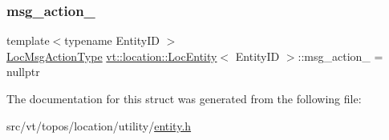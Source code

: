 \subsubsection{\texorpdfstring{msg\+\_\+action\+\_\+}{msg\_action\_}}
{\footnotesize\ttfamily template$<$typename Entity\+ID $>$ \\
\hyperlink{namespacevt_1_1location_ad0a130e4d79e745543925240e13e8f08}{Loc\+Msg\+Action\+Type} \hyperlink{structvt_1_1location_1_1_loc_entity}{vt\+::location\+::\+Loc\+Entity}$<$ Entity\+ID $>$\+::msg\+\_\+action\+\_\+ = nullptr\hspace{0.3cm}{\ttfamily [private]}}



The documentation for this struct was generated from the following file\+:\begin{DoxyCompactItemize}
\item 
src/vt/topos/location/utility/\hyperlink{topos_2location_2utility_2entity_8h}{entity.\+h}\end{DoxyCompactItemize}
